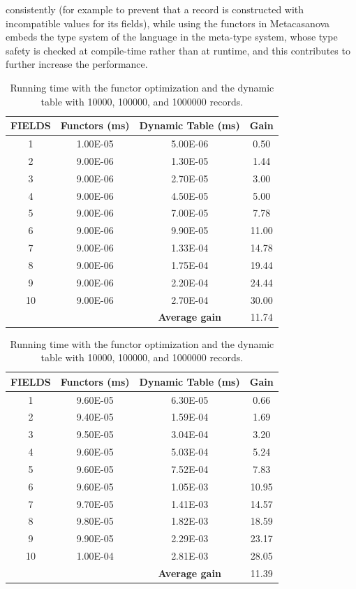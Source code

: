 consistently (for example to prevent that a record is constructed with incompatible values for its fields), while using the functors in Metacasanova embeds the type system of the language in the meta-type system, whose type safety is checked at compile-time rather than at runtime, and this contributes to further increase the performance.

\begin{table}	
	\caption{Running time with the functor optimization and the dynamic table with 10000, 100000, and 1000000 records.}
	\begin{tabular}{|c|c|c|c|}
		\hline
		\textbf{FIELDS}& \textbf{Functors (ms)}&\textbf{Dynamic Table (ms)} & \textbf{Gain}\\ \hline
		1&	1.00E-05&	5.00E-06&	0.50\\ \hline
		2&	9.00E-06&	1.30E-05&	1.44\\ \hline
		3&	9.00E-06&	2.70E-05&	3.00\\ \hline
		4&	9.00E-06&	4.50E-05&	5.00\\ \hline
		5&	9.00E-06&	7.00E-05&	7.78\\ \hline
		6&	9.00E-06&	9.90E-05&	11.00\\ \hline
		7&	9.00E-06&	1.33E-04&	14.78\\ \hline
		8&	9.00E-06&	1.75E-04&	19.44\\ \hline
		9&	9.00E-06&	2.20E-04&	24.44\\ \hline
		10&	9.00E-06&	2.70E-04&	30.00\\ \hline
		\multicolumn{2}{c|}{} & \textbf{Average gain} & 11.74\\ \cline{3-4}			
	\end{tabular}
	
	\vspace{0.15cm}
	\begin{tabular}{|c|c|c|c|}
		\hline
		\textbf{FIELDS}& \textbf{Functors (ms)}&\textbf{Dynamic Table (ms)} & \textbf{Gain}\\ \hline
		1&	9.60E-05&	6.30E-05&	0.66\\ \hline
		2&	9.40E-05&	1.59E-04&	1.69\\ \hline
		3&	9.50E-05&	3.04E-04&	3.20\\ \hline
		4&	9.60E-05&	5.03E-04&	5.24\\ \hline
		5&	9.60E-05&	7.52E-04&	7.83\\ \hline
		6&	9.60E-05&	1.05E-03&	10.95\\ \hline
		7&	9.70E-05&	1.41E-03&	14.57\\ \hline
		8&	9.80E-05&	1.82E-03&	18.59\\ \hline
		9&	9.90E-05&	2.29E-03&	23.17\\ \hline
		10&	1.00E-04&	2.81E-03&	28.05\\ \hline
		\multicolumn{2}{c|}{} & \textbf{Average gain} & 11.39\\ \cline{3-4}						
	\end{tabular}
	

\end{table}
